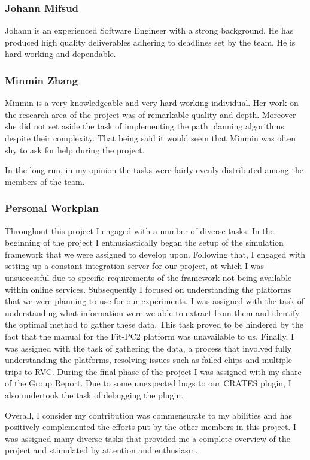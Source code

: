 \subsubsection{Johann Mifsud}
Johann is an experienced Software Engineer with a strong background. He
has produced high quality deliverables adhering to deadlines set by the team.
He is hard working and dependable.

\subsubsection{Minmin Zhang}
Minmin is a very knowledgeable and very hard working individual. Her work on the
research area of the project was of remarkable quality and depth. Moreover she
did not set aside the task of implementing the path planning algorithms despite
their complexity. That being said it would seem that Minmin was often shy to
ask for help during the project.

In the long run, in my opinion the tasks were fairly evenly distributed among
the members of the team.

\subsubsection{Personal Workplan}
Throughout this project I engaged with a number of diverse tasks. In the
beginning of the project I enthusiastically began the setup of the simulation
framework that we were assigned to develop upon. Following that, I engaged with
setting up a constant integration server for our project, at which I was
unsuccessful due to specific requirements of the framework not being available
within online services. Subsequently I focused on understanding the platforms
that we were planning to use for our experiments. I was assigned with the task
of understanding what information were we able to extract from them and identify
the optimal method to gather these data. This task proved to be hindered by the
fact that the manual for the Fit-PC2 platform was unavailable to us. Finally, I
was assigned with the task of gathering the data, a process that involved fully
understanding the platforms, resolving issues such as failed chips and multiple
trips to RVC. During the final phase of the project I was assigned with my share
of the Group Report. Due to some unexpected bugs to our CRATES plugin, I also
undertook the task of debugging the plugin.

Overall, I consider my contribution was commensurate to my abilities and has
positively complemented the efforts put by the other members in this project. I
was assigned many diverse tasks that provided me a complete overview of the
project and stimulated by attention and enthusiasm.

